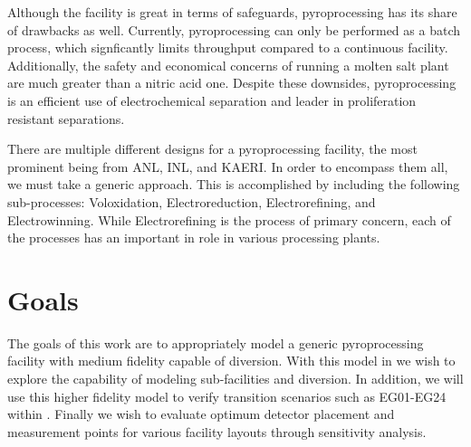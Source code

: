 Although the facility is great in terms of safeguards, pyroprocessing has its share of drawbacks as well.
Currently, pyroprocessing can only be performed as a batch process, which signficantly limits throughput compared to a continuous facility. 
Additionally, the safety and economical concerns of running a molten salt plant are much greater than a nitric acid one.
Despite these downsides, pyroprocessing is an efficient use of electrochemical separation and leader in proliferation resistant separations.

There are multiple different designs for a pyroprocessing facility, the most prominent being from ANL, INL, and KAERI. In order to encompass them all, we must take a generic approach. This is accomplished by including the following sub-processes: Voloxidation, Electroreduction, Electrorefining, and Electrowinning. While Electrorefining is the process of primary concern, each of the processes has an important in role in various processing plants. 

\section{Goals}

The goals of this work are to appropriately model a generic pyroprocessing facility with medium fidelity capable of diversion. With this model
in \Cyclus we wish to explore the capability of modeling sub-facilities and diversion. In addition, we will use this higher fidelity model to verify transition
scenarios such as EG01-EG24 within \Cyclus \cite{wigeland_nuclear_2014}. Finally we wish to evaluate optimum detector placement and measurement points for
various facility layouts through sensitivity analysis. 